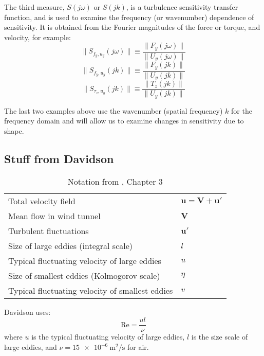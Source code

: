 \documentclass{jfm}
\begin{document}
The third measure, $S(j\omega)$ or $S(jk)$, is a turbulence sensitivity transfer function, and is used to examine the frequency (or wavenumber) dependence of sensitivity.  It is obtained from the Fourier magnitudes of the force or torque, and velocity, for example: 
\begin{equation}
\| S_{f_y,u_y}(j\omega) \| \equiv \frac{\| F_y(j\omega) \|}{\| U_y(j\omega) \|}  
\end{equation}
\begin{equation}
\| S_{f_y,u_y}(jk) \| \equiv \frac{\| F_y(jk) \|}{\| U_y(jk) \|}  
\end{equation}
\begin{equation}
\| S_{\tau_z,u_y}(jk) \| \equiv \frac{\| T_z(jk) \|}{\| U_y(jk) \|}  
\end{equation}

The last two examples above use the wavenumber (spatial frequency) $k$ for the frequency domain and will allow us to examine changes in sensitivity due to shape. 

\subsection{Stuff from Davidson}

\begin{table}
\caption{Notation from \cite{Davidson:2004}, Chapter 3}
\begin{tabular}{ll}
Total velocity field & $\mathbf{u} = \mathbf{V}+\mathbf{u'}$ \\
Mean flow in wind tunnel & $\mathbf{V}$ \\
Turbulent fluctuations & $\mathbf{u'}$ \\
Size of large eddies (integral scale) & $l$ \\
Typical fluctuating velocity of large eddies & $u$ \\
Size of smallest eddies (Kolmogorov scale) & $\eta$ \\
Typical fluctuating velocity of smallest eddies & $v$ \\
\end{tabular}
\end{table}

Davidson uses:
\begin{equation}
\mbox{Re} = \frac{u l}{\nu}
\end{equation}
where $u$ is the typical fluctuating velocity of large eddies, $l$ is the size scale of large eddies, and $\nu = \SI{15e-6}{\meter\squared\per\second}$ for air. 
\end{document}
